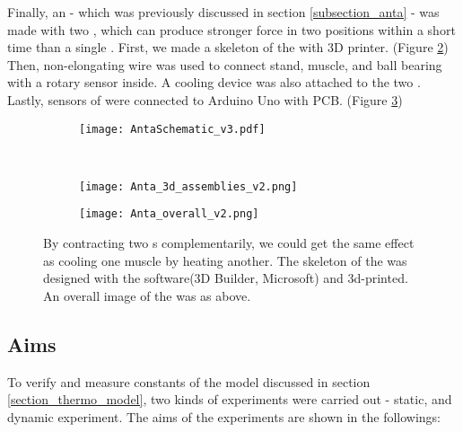 Finally, an \anta - which was previously discussed in section \ref{subsection_anta} - was made with two \scpsnospace, which can produce stronger force in two positions within a short time than a single \scpnospace.
First, we made a skeleton of the \anta with 3D printer. (Figure \ref{3d_assemblies}) Then, non-elongating wire was used to connect stand, muscle, and ball bearing with a rotary sensor inside. A cooling device was also attached to the two \scpsnospace. Lastly, sensors of \anta were connected to Arduino Uno with PCB. (Figure \ref{anta_overall})


\begin{figure}[t]
	\centering
	\begin{subfigure}[t]{0.5\textwidth}
		\centering\texttt{[image: AntaSchematic\_v3.pdf]}
		\caption{\label{anta_sch}}
	\end{subfigure}
	~			
	\begin{subfigure}[t]{0.3\textwidth}
		\centering\texttt{[image: Anta\_3d\_assemblies\_v2.png]}
		\caption{\label{3d_assemblies}}
	\end{subfigure}
	
	\begin{subfigure}[t]{0.81\textwidth}
		\centering\texttt{[image: Anta\_overall\_v2.png]}
		\caption{\label{anta_overall}}
	\end{subfigure}
	
	\caption[\Anta]{ By contracting two \scpnospace s complementarily, we could get the same effect as cooling one muscle by heating another.  The skeleton of the \anta was designed with the software(3D Builder, Microsoft) and 3d-printed.  An overall image of the \anta was as above.}
	\label{anta_design}
\end{figure}



\subsection{Aims}\label{section_aims}
To verify and measure constants of the model discussed in section \ref{section_thermo_model}, two kinds of experiments were carried out - static, and dynamic experiment. The aims of the experiments are shown in the followings:

